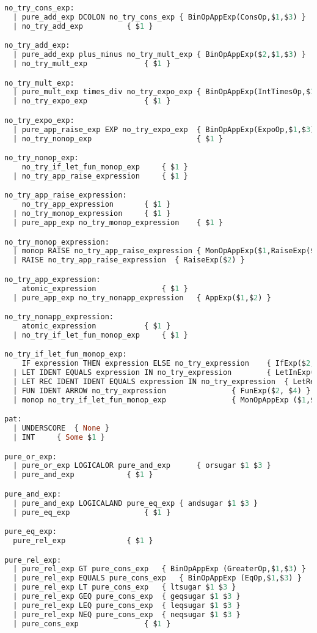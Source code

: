 \begin{lstlisting}[language=Caml, caption=tailRecPicoMLparse.mly]
no_try_cons_exp:
  | pure_add_exp DCOLON no_try_cons_exp { BinOpAppExp(ConsOp,$1,$3) }
  | no_try_add_exp			{ $1 }

no_try_add_exp:
  | pure_add_exp plus_minus no_try_mult_exp	{ BinOpAppExp($2,$1,$3) }
  | no_try_mult_exp				{ $1 }

no_try_mult_exp:
  | pure_mult_exp times_div no_try_expo_exp	{ BinOpAppExp(IntTimesOp,$1,$3) }
  | no_try_expo_exp				{ $1 }

no_try_expo_exp:
  | pure_app_raise_exp EXP no_try_expo_exp	{ BinOpAppExp(ExpoOp,$1,$3) }
  | no_try_nonop_exp                    	{ $1 }

no_try_nonop_exp:
    no_try_if_let_fun_monop_exp		{ $1 }
  | no_try_app_raise_expression		{ $1 }

no_try_app_raise_expression:
    no_try_app_expression		{ $1 }
  | no_try_monop_expression		{ $1 }
  | pure_app_exp no_try_monop_expression	{ $1 }

no_try_monop_expression:
  | monop RAISE no_try_app_raise_expression { MonOpAppExp($1,RaiseExp($3)) }
  | RAISE no_try_app_raise_expression  { RaiseExp($2) }

no_try_app_expression:
    atomic_expression				{ $1 } 
  | pure_app_exp no_try_nonapp_expression 	{ AppExp($1,$2) }

no_try_nonapp_expression:
    atomic_expression			{ $1 }
  | no_try_if_let_fun_monop_exp		{ $1 }

no_try_if_let_fun_monop_exp:
    IF expression THEN expression ELSE no_try_expression	{ IfExp($2,$4,$6) }
  | LET IDENT EQUALS expression IN no_try_expression		{ LetInExp($2,$4,$6) }
  | LET REC IDENT IDENT EQUALS expression IN no_try_expression	{ LetRecInExp($3,$4,$6,$8) }
  | FUN IDENT ARROW no_try_expression				{ FunExp($2, $4) }
  | monop no_try_if_let_fun_monop_exp				{ MonOpAppExp ($1,$2) }

pat:
  | UNDERSCORE	{ None }
  | INT		{ Some $1 }

pure_or_exp:
  | pure_or_exp LOGICALOR pure_and_exp		{ orsugar $1 $3 }
  | pure_and_exp   			{ $1 }

pure_and_exp:
  | pure_and_exp LOGICALAND pure_eq_exp	{ andsugar $1 $3 }
  | pure_eq_exp	     			{ $1 }

pure_eq_exp:
  pure_rel_exp	     		{ $1 }

pure_rel_exp:
  | pure_rel_exp GT pure_cons_exp	{ BinOpAppExp (GreaterOp,$1,$3) }
  | pure_rel_exp EQUALS pure_cons_exp	{ BinOpAppExp (EqOp,$1,$3) }
  | pure_rel_exp LT pure_cons_exp	{ ltsugar $1 $3 }
  | pure_rel_exp GEQ pure_cons_exp	{ geqsugar $1 $3 }
  | pure_rel_exp LEQ pure_cons_exp	{ leqsugar $1 $3 }
  | pure_rel_exp NEQ pure_cons_exp	{ neqsugar $1 $3 }
  | pure_cons_exp	     		{ $1 }


\end{lstlisting}
